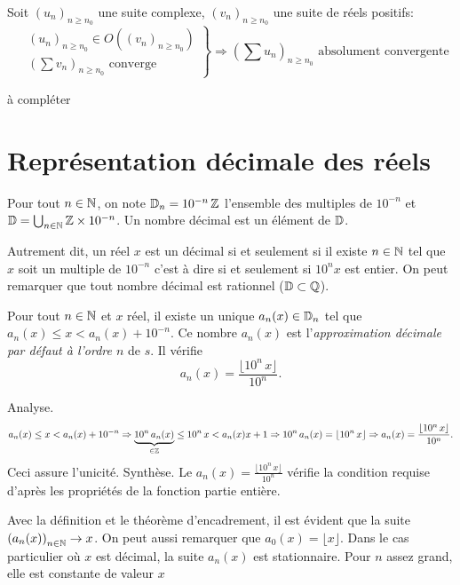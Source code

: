 \begin{prop}
  Soit $\left( u_n\right)_{n\geq n_0}$ une suite complexe, $\left( v_n\right)_{n\geq n_0}$ une suite de réels positifs:
\begin{displaymath}
\left. 
\begin{aligned}
  &\left( u_n\right)_{n\geq n_0} \in O\left(\left( v_n\right)_{n\geq n_0} \right) \\
  & \left(\sum v_n\right)_{n\geq n_0} \text{ converge}
\end{aligned}
\right\rbrace \Rightarrow
\left( \sum u_n\right)_{n\geq n_0} \text{ absolument convergente}
\end{displaymath}
\end{prop}
\begin{demo}
  à compléter
\end{demo}

\section{Représentation décimale des réels}
\begin{defi}
  Pour tout $n\in \mathbb{N}$, on note $\mathbb{D}_n = 10^{-n}\,\mathbb{Z}$ l'ensemble des multiples de $10^{-n}$ et $\mathbb{D} = \bigcup_{n\in \mathbb{N}}\mathbb{Z} \times 10^{-n}$. Un nombre décimal est un élément de $\mathbb{D}$.
\end{defi}
Autrement dit, un réel $x$ est un décimal si et seulement si il existe $n\in \mathbb{N}$ tel que $x$ soit un multiple de $10^{-n}$ c'est à dire si et seulement si $10^{n}x$ est entier. On peut remarquer que tout nombre décimal est rationnel ($\mathbb{D} \subset \mathbb{Q}$).\newline
{} 
\begin{propn} \label{appdec}
Pour tout $n\in \mathbb{N}$ et $x$ réel, il existe un unique $a_n(x)\in \mathbb{D}_n$ tel que $a_n(x)\leq x < a_n(x) + 10^{-n}$.\newline
Ce nombre $a_n(x)$ est l'\emph{approximation décimale par défaut à l'ordre $n$} de $s$. Il vérifie
\[
 a_n(x) = \frac{\lfloor10^n\, x\rfloor }{10^n}.
\]
\end{propn}
\begin{demo}
 Analyse. 
\[
 a_n(x)\leq x < a_n(x) + 10^{-n} \Rightarrow \underset{\in \mathbb{Z}}{\underbrace{10^n\,a_n(x)}}\leq 10^n\,x < a_n(x)x + 1
 \Rightarrow 10^n\,a_n(x) = \lfloor 10^n\,x \rfloor \Rightarrow a_n(x) = \frac{\lfloor 10^n\,x \rfloor}{10^n}.
\]
Ceci assure l'unicité.\newline
Synthèse. Le $a_n(x) = \frac{\lfloor 10^n\,x \rfloor}{10^n}$ vérifie la condition requise d'après les propriétés de la fonction partie entière. 
\end{demo}
\begin{rems}
 Avec la définition et le théorème d'encadrement, il est évident que la suite $\left( a_n(x) \right)_{n \in \mathbb{N}} \rightarrow x$.\newline
 On peut aussi remarquer que $a_0(x) = \lfloor x \rfloor$.\newline
 Dans le cas particulier où $x$ est décimal, la suite $a_n(x)$ est stationnaire. Pour $n$ assez grand, elle est constante de valeur $x$
\end{rems}

